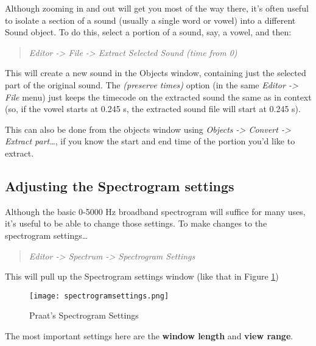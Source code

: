Although zooming in and out will get you most of the way there, it's
often useful to isolate a section of a sound (usually a single word or
vowel) into a different Sound object. To do this, select a portion of a
sound, say, a vowel, and then:

\begin{quote}
\emph{Editor -\textgreater{} File -\textgreater{} Extract Selected Sound
(time from 0)}
\end{quote}

This will create a new sound in the Objects window, containing just the
selected part of the original sound. The \emph{(preserve times)} option
(in the same \emph{Editor -\textgreater{} File} menu) just keeps the
timecode on the extracted sound the same as in context (so, if the vowel
starts at 0.245 s, the extracted sound file will start at 0.245 s).

This can also be done from the objects window using \emph{Objects
-\textgreater{} Convert -\textgreater{} Extract part\ldots{}}, if you
know the start and end time of the portion you'd like to extract.

\hypertarget{adjusting-the-spectrogram-settings}{%
\subsection{Adjusting the Spectrogram
settings}\label{adjusting-the-spectrogram-settings}}

\label{subsec:spectrogramsettings}

Although the basic 0-5000 Hz broadband spectrogram will suffice for many
uses, it's useful to be able to change those settings. To make changes
to the spectrogram settings\ldots{}

\begin{quote}
\emph{Editor -\textgreater{} Spectrum -\textgreater{} Spectrogram
Settings}
\end{quote}

This will pull up the Spectrogram settings window (like that in Figure
\ref{spectrogramsettings})

\begin{figure}
  \centerline{
    \mbox{\texttt{[image: spectrogramsettings.png]}}
  }
  \caption{Praat's Spectrogram Settings \label{spectrogramsettings}}

  \end{figure}

The most important settings here are the \textbf{window length} and
\textbf{view range}.

